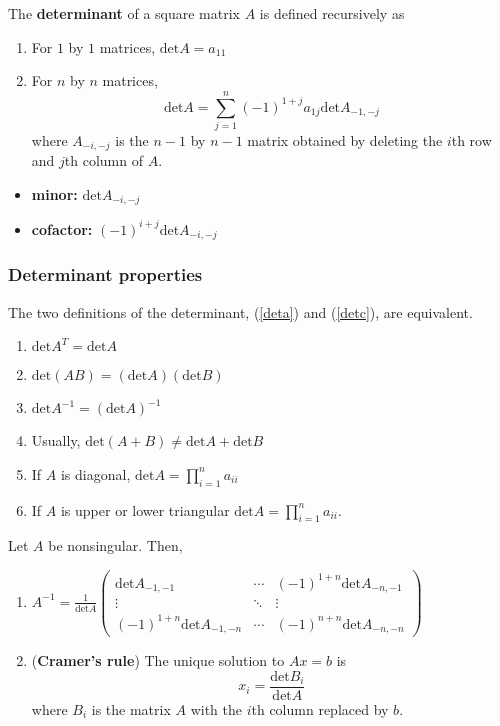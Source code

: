 \documentclass[compress]{beamer}
\renewcommand{\det}{\mathrm{det}}
\begin{document}
\begin{frame}
  \begin{definition}\label{detc}
    The \textbf{determinant} of a square matrix $A$ is defined
    recursively as
    \begin{enumerate}
    \item For $1$ by $1$ matrices, $\det A = a_{11}$
    \item For $n$ by $n$ matrices, 
      \[ \det A = \sum_{j=1}^n (-1)^{1+j} a_{1j} \det A_{-1,-j} \]
      where $A_{-i,-j}$ is the $n-1$ by $n-1$ matrix obtained by
      deleting the $i$th row and $j$th column of $A$.
    \end{enumerate}
  \end{definition}
  \begin{itemize}
  \item \textbf{minor:} $\det A_{-i,-j}$ 
  \item \textbf{cofactor:} $(-1)^{i+j} \det A_{-i,-j}$
  \end{itemize}
\end{frame}

\begin{frame}
  \frametitle{Determinant properties}
  \begin{theorem}
    The two definitions of the determinant, (\ref{deta}) and
    (\ref{detc}), are equivalent.
  \end{theorem}
  \begin{enumerate}
  \item $\det A^T = \det A$
  \item $\det (AB) = (\det A) (\det B)$
  \item $\det A^{-1} = (\det A)^{-1}$
  \item Usually, $\det(A + B) \neq \det A + \det B$
  \item If $A$ is diagonal, $\det A = \prod_{i=1}^n a_{ii}$
  \item\label{dpt} If $A$ is upper or lower triangular $\det A = \prod_{i=1}^n
    a_{ii}$.  
  \end{enumerate}
\end{frame}

\begin{frame}
  \begin{theorem}
    Let $A$ be nonsingular. Then,
    \begin{enumerate}
    \item $A^{-1} = \frac{1}{\det A} \begin{pmatrix} 
        \det A_{-1,-1} & \cdots & (-1)^{1+n} \det A_{-n,-1} \\
        \vdots & \ddots & \vdots \\
        (-1)^{1+n} \det A_{-1,-n} & \cdots & (-1)^{n+n} \det A_{-n,-n} 
      \end{pmatrix}$
    \item (\textbf{Cramer's rule}) The unique solution to $A x = b$ is 
      \[ x_i = \frac{\det B_i}{\det A} \]
      where $B_i$ is the matrix $A$ with the $i$th column replaced by
      $b$. 
    \end{enumerate}
  \end{theorem}
\end{frame}
\end{document}
